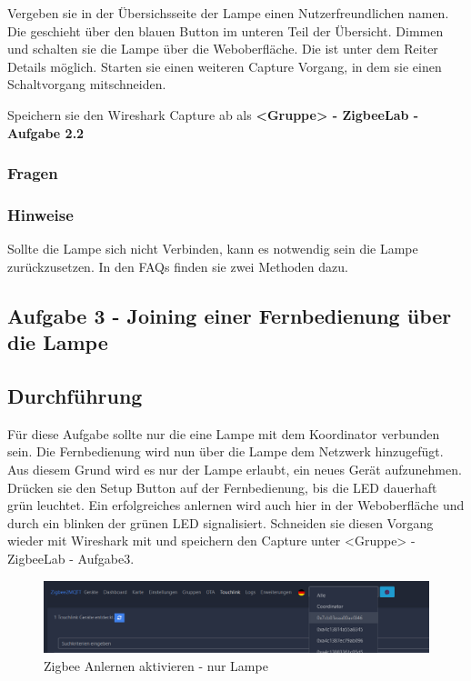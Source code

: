 Vergeben sie in der Übersichsseite der Lampe einen Nutzerfreundlichen namen. Die geschieht über den blauen Button im unteren Teil der Übersicht.
Dimmen und schalten sie die Lampe über die Weboberfläche. Die ist unter dem Reiter \grqq Details\grqq{} möglich. Starten sie einen weiteren Capture Vorgang, in dem sie einen Schaltvorgang mitschneiden.

\begin{Hinweis}
    Speichern sie den Wireshark Capture ab als \textbf{\grqq <Gruppe> - ZigbeeLab - Aufgabe 2.2\grqq{}}
\end{Hinweis}

\subsubsection{Fragen}

\subsubsection{Hinweise}
Sollte die Lampe sich nicht Verbinden, kann es notwendig sein die Lampe zurückzusetzen. In den FAQs finden sie zwei Methoden dazu.

\subsection{Aufgabe 3 - Joining einer Fernbedienung über die Lampe}

\subsection{Durchführung}
Für diese Aufgabe sollte nur die eine Lampe mit dem Koordinator verbunden sein. Die Fernbedienung wird nun über die Lampe dem Netzwerk hinzugefügt. Aus diesem Grund wird es nur der Lampe
erlaubt, ein neues Gerät aufzunehmen. Drücken sie den Setup Button auf der Fernbedienung, bis die LED dauerhaft grün leuchtet. Ein erfolgreiches anlernen wird auch hier in der Weboberfläche
und durch ein blinken der grünen LED signalisiert. Schneiden sie diesen Vorgang wieder mit Wireshark mit und speichern den Capture unter \grqq <Gruppe> - ZigbeeLab - Aufgabe3\grqq{}.

\begin{figure}[H]
    \centering
    \includegraphics[width=1\textwidth]{media/Z2M-Anlernen-Lampe.png}
    \caption{Zigbee Anlernen aktivieren - nur Lampe}
\end{figure}

